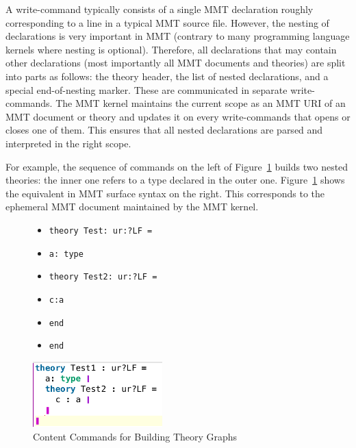 A write-command typically consists of a single MMT declaration roughly corresponding to a line in a typical MMT source file.
However, the nesting of declarations is very important in MMT (contrary to many programming language kernels where nesting is optional).
Therefore, all declarations that may contain other declarations (most importantly all MMT documents and theories) are split into parts as follows: the theory header, the list of nested declarations, and a special end-of-nesting marker. These are communicated in separate write-commands.
The MMT kernel maintains the current scope as an MMT URI of an MMT document or theory and updates it on every write-commands that opens or closes one of them.
This ensures that all nested declarations are parsed and interpreted in the right scope.

For example, the sequence of commands  on the left of Figure~\ref{fig:test_theory} builds two nested theories: the inner one refers to a type declared in the outer one. Figure~\ref{fig:test_theory} shows the equivalent in MMT surface syntax on the right. This corresponds to the ephemeral MMT document maintained by the MMT kernel.
\begin{figure}[ht]\centering
  \begin{minipage}[c]{8cm}
\begin{itemize}
\item \texttt{theory Test: ur:?LF =}
\item \texttt{a: type}
\item \texttt{theory Test2: ur:?LF =}
\item \texttt{c:a}
\item \texttt{end}
\item \texttt{end}
\end{itemize}
\end{minipage}\quad
\begin{minipage}[c]{5cm}\includegraphics[width=5cm]{test_theory}\end{minipage}
\caption{Content Commands for Building Theory Graphs}\label{fig:test_theory}
\end{figure}

